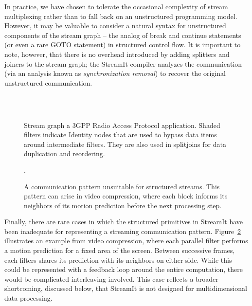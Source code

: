  In practice, we have chosen to tolerate the occasional complexity of
  stream multiplexing rather than to fall back on an unstructured
  programming model.  However, it may be valuable to consider a
  natural syntax for unstructured components of the stream graph --
  the analog of break and continue statements (or even a rare GOTO
  statement) in structured control flow. It is important to note,
  however, that there is no overhead introduced by adding splitters
  and joiners to the stream graph; the StreamIt compiler analyzes the
  communication (via an analysis known as {\it synchronization
  removal}) to recover the original unstructured communication.

\begin{figure}[t!]
\vspace{-0.9in} ~ \\
\mbox{~}\hspace{2.03in}\begin{minipage}{4in}
\caption[Stream graph for 3GPP]{Stream graph a 3GPP Radio Access
  Protocol application.  Shaded filters indicate Identity nodes that
  are used to bypass data items around intermediate filters.  They are
  also used in splitjoins for data duplication and
  reordering.\protect\label{fig:3gpp}}
\vspace{-0.5in}
\end{minipage}
\end{figure}

\begin{figure}[t]
\centering
{}

\caption[A communication pattern unsuitable for structured streams.]{A
  communication pattern unsuitable for structured streams.  This
  pattern can arise in video compression, where each block informs its
  neighbors of its motion prediction before the next processing
  step.\protect\label{fig:inadequate}}.
\end{figure}

  Finally, there are rare cases in which the structured primitives in
  StreamIt have been inadequate for representing a streaming
  communication pattern.  Figure~\ref{fig:inadequate} illustrates an
  example from video compression, where each parallel filter performs
  a motion prediction for a fixed area of the screen.  Between
  successive frames, each filters shares its prediction with its
  neighbors on either side.  While this could be represented with a
  feedback loop around the entire computation, there would be
  complicated interleaving involved.  This case reflects a broader
  shortcoming, discussed below, that StreamIt is not designed for
  multidimensional data processing.

